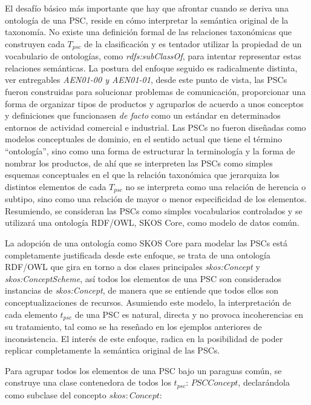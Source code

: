 El desafío básico más importante que hay que afrontar cuando se deriva una
ontología de una PSC, reside en cómo interpretar la semántica original de la taxonomía.
No existe una definición formal de las relaciones taxonómicas que construyen
cada $T_{psc}$ de la clasificación y es tentador utilizar la propiedad de un
vocabulario de ontologías, como \textit{rdfs:subClassOf}, para intentar
representar estas relaciones semánticas. La postura del enfoque seguido es 
radicalmente distinta, ver entregables \textit{AEN01-00 y AEN01-01}, desde este punto de vista, las PSCs fueron construidas 
para solucionar problemas de comunicación, proporcionar una
forma de organizar tipos de productos y agruparlos de acuerdo a unos conceptos y
definiciones que funcionasen \textit{de facto} como un estándar en determinados
entornos de actividad comercial e industrial. Las PSCs no fueron diseñadas como
modelos conceptuales de dominio, en el sentido actual que tiene el término
``ontología'', sino como una forma de estructurar la terminología y la forma de
nombrar los productos, de ahí que se interpreten las PSCs como simples
esquemas conceptuales en el que la relación taxonómica que jerarquiza los
distintos elementos de cada $T_{psc}$ no se interpreta como una relación de
herencia o subtipo, sino como una relación de mayor o menor especificidad de los
elementos. Resumiendo, se consideran las PSCs como simples vocabularios
controlados y se utilizará una ontología RDF/\gls{OWL}, \gls{SKOS} Core, como modelo de
datos común.

La adopción de una ontología como SKOS Core para modelar las PSCs está
completamente justificada desde este enfoque, se trata de una ontología RDF/OWL que gira en torno a dos clases principales
\textit{skos:Concept} y \textit{skos:ConceptScheme}, así todos los elementos de una
PSC son considerados instancias de \textit{skos:Concept}, de manera que se
entiende que todos ellos son conceptualizaciones de recursos. Asumiendo este
modelo, la interpretación de cada elemento $t_{psc}$ de una PSC es natural, directa y no provoca incoherencias en su 
tratamiento, tal como se ha reseñado en los ejemplos anteriores de inconsistencia. El interés de este enfoque, radica en la posibilidad de poder 
replicar completamente la semántica original de las PSCs.

Para agrupar todos los elementos de una \gls{PSC} bajo un paraguas común, se construye una
clase contenedora de todos los $t_{psc}$: $PSCConcept$, declarándola como
subclase del concepto $skos:Concept$: 

